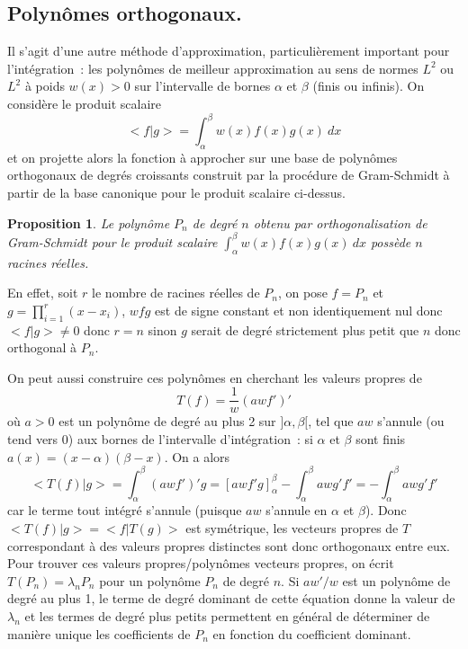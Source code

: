 \documentclass[a4paper,11pt]{article}
\newtheorem{prop}[thm]{Proposition}
\begin{document}
\begin{giacjshere}
\subsection{Polynômes orthogonaux.}
Il s'agit d'une autre m\'ethode d'approximation, 
particuli\`erement important pour l'int\'egration~: les polyn\^omes
de meilleur approximation au sens de normes $L^2$ ou $L^2$
\`a poids $w(x)>0$ sur l'intervalle de bornes $\alpha$ et $\beta$
(finis ou infinis). 
On consid\`ere le produit scalaire
$$ <f|g>=\int_\alpha^\beta w(x) f(x)g(x) \ dx$$
et on projette alors la fonction \`a approcher 
sur une base de polyn\^omes orthogonaux
de degr\'es croissants construit par la proc\'edure
de Gram-Schmidt \`a partir de la base canonique
pour le produit scalaire ci-dessus.

\begin{prop}
Le polyn\^ome $P_n$ de degr\'e $n$
obtenu par orthogonalisation de Gram-Schmidt
pour le produit scalaire $\int_\alpha^\beta w(x) f(x)g(x) \ dx$
poss\`ede $n$ racines r\'eelles.
\end{prop}
En effet, soit $r$ le nombre de racines r\'eelles de $P_n$, on pose $f=P_n$ et 
$g=\prod_{i=1}^r (x-x_i)$, $wfg$ est de signe constant
et non identiquement nul donc $<f|g> \neq 0$ donc
$r=n$ sinon $g$ serait de degr\'e strictement plus petit que $n$
donc orthogonal \`a $P_n$.

On peut aussi construire ces polyn\^omes en cherchant les valeurs
propres de
$$ T(f)=\frac{1}{w} (awf')'$$
o\`u $a>0$ est un polyn\^ome de degr\'e au plus 2
sur $]\alpha,\beta[$, tel que $aw$ s'annule (ou tend vers 0) 
aux bornes de l'intervalle d'int\'egration~: si $\alpha$ et $\beta$ sont finis
$a(x)=(x-\alpha)(\beta-x)$.
On a alors
$$ <T(f)|g>=\int_\alpha^\beta (awf')'g =
[awf'g]_\alpha^\beta-\int_\alpha^\beta awg'f'
=-\int_\alpha^\beta awg'f'$$
car le terme tout int\'egr\'e s'annule 
(puisque $aw$ s'annule en $\alpha$ et $\beta$). Donc $<T(f)|g>=<f|T(g)>$
est sym\'etrique, les vecteurs propres de $T$ correspondant \`a des
valeurs propres distinctes sont donc orthogonaux entre eux.
Pour trouver ces valeurs propres/polyn\^omes vecteurs propres, on
\'ecrit $T(P_n)=\lambda_n P_n$ pour un polyn\^ome $P_n$ de degr\'e
$n$. Si $aw'/w$ est un polyn\^ome de degr\'e au plus 1, 
le terme de degr\'e dominant de cette \'equation
donne la valeur de $\lambda_n$ et les termes de degr\'e plus petits
permettent en g\'en\'eral de d\'eterminer de mani\`ere unique les
coefficients de $P_n$ en fonction du coefficient dominant.


\end{giacjshere}
\end{document}
